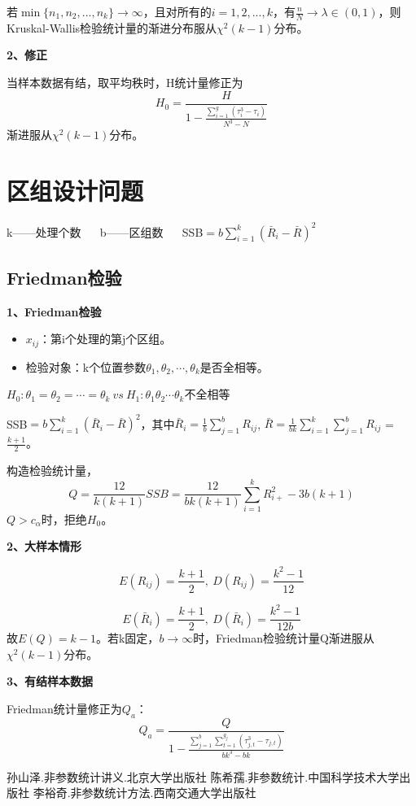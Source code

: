 \documentclass[lang=cn,10pt]{elegantbook}
\begin{document}
若$\min\{n_1,n_2,...,n_k\} \rightarrow \infty$，且对所有的$i = 1,2,...,k$，有$\frac{n}{N} \rightarrow \lambda \in (0,1)$，则Kruskal-Wallis检验统计量的渐进分布服从$\chi^2(k-1)$分布。

\textbf{2、修正}

当样本数据有结，取平均秩时，H统计量修正为
$$
    H_0 = \frac H{1-\frac{\sum_{i = 1}^g (\tau_i^3 - \tau_i)}{N^3 - N}}
$$
渐进服从$\chi^2 (k - 1)$分布。

\chapter{区组设计问题}
\begin{center}
    k——处理个数 ~~ b——区组数 ~~ SSB$ = b \sum_{i = 1}^{k} (\bar{R}_i - \bar{R})^2$
\end{center}
\section{Friedman检验}
\textbf{1、Friedman检验}
\begin{itemize}
    \item $x_{ij}$：第i个处理的第j个区组。
    \item 检验对象：k个位置参数$\theta_1,\theta_2,\cdots,\theta_k$是否全相等。
\end{itemize}

\begin{center}
    $H_0:\theta_1 = \theta_2 = \cdots = \theta_k ~vs~ H_1: \theta_1 \theta_2 \cdots \theta_k$不全相等
\end{center}

SSB$ = b \sum_{i = 1}^{k} (\bar{R}_i - \bar{R})^2$，其中$\bar{R}_i = \frac1{b} \sum_{j = 1}^{b} R_{ij}$, $\bar{R} = \frac1{bk} \sum_{i = 1}^{k}\sum_{j = 1}^{b} R_{ij}$ = $\frac{k+1}{2}$。

构造检验统计量，
$$
    Q = \frac{12}{k(k+1)}SSB = \frac{12}{bk(k+1)}\sum_{i = 1}^{k} R_{i+}^2 - 3 b(k+1)
$$
$Q > c_{\alpha}$时，拒绝$H_0$。

\textbf{2、大样本情形}

$$
    E(R_{ij}) = \frac{k+1}2, ~ D(R_{ij}) = \frac{k^2-1}{12}
$$

$$
    E(\bar{R}_i) = \frac{k+1}2, ~ D(\bar{R}_i) = \frac{k^2-1}{12b}
$$
故$E(Q) = k-1$。若k固定，$b \rightarrow \infty$时，Friedman检验统计量Q渐进服从$\chi^2(k-1)$分布。

\textbf{3、有结样本数据}

Friedman统计量修正为$Q_a$：
$$
    Q_a = \frac{Q}{1 - \frac{\sum_{j = 1}^{b}\sum_{t = 1}^{g_j} (\tau_{j,t}^3 - \tau_{j,t})}{bk^3 - bk}}
$$





\begin{thebibliography}{3}
    孙山泽.非参数统计讲义.北京大学出版社
    陈希孺.非参数统计.中国科学技术大学出版社
    李裕奇.非参数统计方法.西南交通大学出版社
\end{thebibliography}
\end{document}
